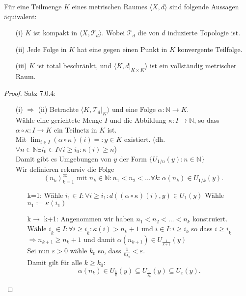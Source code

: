\thm{}
{
Für eine Teilmenge $K$ eines metrischen Raumes $\langle X, d \rangle$ sind folgende Aussagen äquivalent:
\begin{itemize}
    \item[(i)] $K$ ist kompakt in $\langle X, \mathcal{T}_d \rangle$.
    Wobei $\mathcal{T}_d$ die von $d$ induzierte Topologie ist.
    \item[(ii)] Jede Folge in $K$ hat eine gegen einen Punkt in $K$ konvergente Teilfolge.
    \item[(iii)] $K$ ist total beschränkt, und $\langle K, d\vert_{K \times K} \rangle$ 
    ist ein vollständig metrischer Raum.
\end{itemize}
}

\begin{proof}{Satz 7.0.4:}\\
    \begin{itemize}
        \item[(i) $\Rightarrow$ (ii)] 
        Betrachte $\langle K, \mathcal{T}_{d}\vert_{K} \rangle$ und eine Folge $\alpha: \mathbb{N} \to K$.\\
        Wähle eine gerichtete Menge $I$ und die Abbildung  $\kappa: I \to \mathbb{N}$,
        so dass $\alpha \circ \kappa : I \to K$ ein Teilnetz in $K$ ist.\\
        Mit $\lim_{i \in I} (\alpha \circ \kappa)(i) = : y \in K$ existiert.
        (dh. $\forall n \in \mathbb{N} \exists i_0 \in I \forall i \geq i_0:  \kappa(i) \geq n$)\\
        Damit gibt es Umgebungen von $y$ der Form
        $\{U_{1/n}(y) : n \in \mathbb{N}\}$\\
        Wir definieren rekursiv die Folge 
        $$
        (n_k)_{k=1}^{\infty} \text{ mit } n_k \in \mathbb{N}: n_1 < n_2 < \ldots
        \forall k : \alpha(n_k) \in U_{1/k}(y).
        $$
        \begin{itemize}
            \item[k=1:] Wähle $i_1 \in I: \forall i \geq i_1 : d((\alpha \circ \kappa)(i), y) \in U_1(y)$
            Wähle $n_1 := \kappa(i_1)$
            \item[k$\to$ k+1:] Angenommen wir haben $n_1 < n_2 < \ldots < n_k$ konstruiert.\\
            Wähle $i_{\tilde{k}} \in I: \forall i \geq i_{\tilde{k}} : \kappa(i) > n_k+1$
            und $i \in I: i \geq i_k$ so dass $i \geq i_{\tilde{k}}$\\
            $\Rightarrow n_{k+1}\geq n_k+1$ und damit $\alpha(n_{k+1})\in U_{\frac{1}{k+1}}(y)$\\
            Sei nun $\varepsilon > 0$ wähle $k_0$ so, dass $\frac{1}{n_{k_0}} < \varepsilon$.  \\
            Damit gilt für alle $k \geq k_0$:
            $$
            \alpha(n_k) \in U_{\frac{1}{k}}(y) \subseteq U_{\frac{1}{k_0}}(y) 
            \subseteq U_{\varepsilon}(y).
            $$
        \end{itemize}


\end{itemize}
\end{proof}
